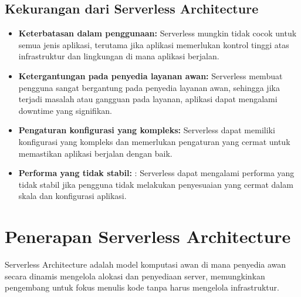 \documentclass[a4paper,12pt]{article}
\begin{document}
\subsection*{Kekurangan dari Serverless Architecture}

\begin{itemize}
	\item \textbf{Keterbatasan dalam penggunaan:} Serverless mungkin tidak cocok untuk semua jenis aplikasi, terutama jika aplikasi memerlukan kontrol tinggi atas infrastruktur dan lingkungan di mana aplikasi berjalan.
	\item \textbf{Ketergantungan pada penyedia layanan awan:} Serverless membuat pengguna sangat bergantung pada penyedia layanan awan, sehingga jika terjadi masalah atau gangguan pada layanan, aplikasi dapat mengalami downtime yang signifikan.
	\item \textbf{Pengaturan konfigurasi yang kompleks:} Serverless dapat memiliki konfigurasi yang kompleks dan memerlukan pengaturan yang cermat untuk memastikan aplikasi berjalan dengan baik.
	\item \textbf{Performa yang tidak stabil:} : Serverless dapat mengalami performa yang tidak stabil jika pengguna tidak melakukan penyesuaian yang cermat dalam skala dan konfigurasi aplikasi.
\end{itemize}

\section*{Penerapan Serverless Architecture}
	Serverless Architecture adalah model komputasi awan di mana penyedia awan secara dinamis mengelola alokasi dan penyediaan server, memungkinkan pengembang untuk fokus menulis kode tanpa harus mengelola infrastruktur.
	
\end{document}
